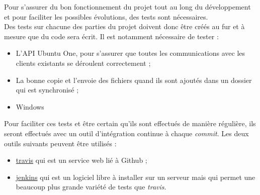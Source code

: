 Pour s'assurer du bon fonctionnement du projet tout au long du développement et pour faciliter les possibles évolutions, des tests sont nécessaires.\\

Des tests sur chacune des parties du projet doivent donc être créés au fur et à mesure que du code sera écrit. Il est notamment nécessaire de tester :\\

\begin{itemize}
\renewcommand{\labelitemi}{$\bullet$}
\item L'API Ubuntu One, pour s'assurer que toutes les communications avec les clients existants se déroulent correctement ;
\item La bonne copie et l'envoie des fichiers quand ils sont ajoutés dans un dossier qui est synchronisé ;
\item Windows
\end{itemize}

\vspace{0.5cm}

Pour faciliter ces tests et être certain qu'ils sont effectués de manière régulière, ils seront effectués avec un outil d'intégration continue à chaque \textit{commit}. Les deux outils suivants peuvent être utilisés :\\

\begin{itemize}
\renewcommand{\labelitemi}{$\bullet$}
\item \href{https://travis-ci.org}{travis} qui est un service web lié à Github ;
\item \href{http://jenkins-ci.org}{jenkins} qui est un logiciel libre à installer sur un serveur mais qui permet une beaucoup plus grande variété de tests que \textit{travis}.
\end{itemize}
